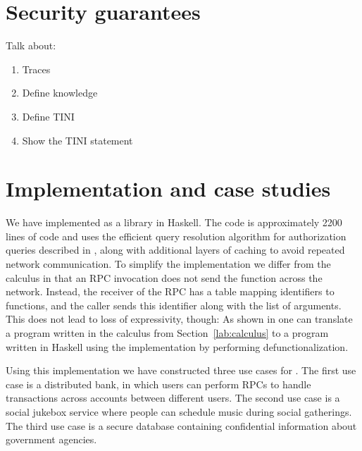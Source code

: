 \documentclass[conference]{IEEEtran}
\begin{document}
\section{Security guarantees}
Talk about:
\begin{enumerate}
    \item Traces
    \item Define knowledge
    \item Define TINI
    \item Show the TINI statement
\end{enumerate}

\section{Implementation and case studies}
We have implemented \lang as a library in Haskell. The code is approximately 2200 lines of code and uses the efficient query resolution algorithm for authorization queries described in \cite{Arden:2015:FA:2859845.2859998}, along with additional layers of caching to avoid repeated network communication. To simplify the implementation we differ from the calculus in that an RPC invocation does not send the function across the network. Instead, the receiver of the RPC has a table mapping identifiers to functions, and the caller sends this identifier along with the list of arguments. This does not lead to loss of expressivity, though: As shown in \cite{Cooper:2009:RC:1599410.1599439} one can translate a program written in the calculus from Section~\ref{lab:calculus} to a program written in Haskell using the \lang implementation by performing defunctionalization.

Using this implementation we have constructed three use cases for \lang. The first use case is a distributed bank, in which users can perform RPCs to handle transactions across accounts between different users. The second use case is a social jukebox service \cite{Lots of citations} where people can schedule music during social gatherings. The third use case is a secure database containing confidential information about government agencies.
\end{document}
